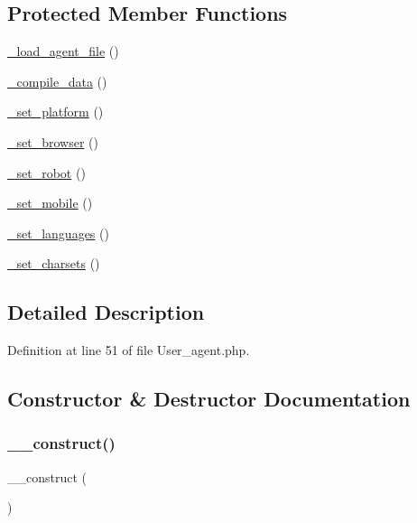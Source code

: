 \subsection*{Protected Member Functions}
\begin{DoxyCompactItemize}
\item 
\mbox{\hyperlink{class_c_i___user__agent_a96ec01490c667b47c5faec7cb53c34b2}{\+\_\+load\+\_\+agent\+\_\+file}} ()
\item 
\mbox{\hyperlink{class_c_i___user__agent_a4ced3acbcc2ab5e599f212c676590d06}{\+\_\+compile\+\_\+data}} ()
\item 
\mbox{\hyperlink{class_c_i___user__agent_a3e3af24bc0adb0483c3965765b28a25b}{\+\_\+set\+\_\+platform}} ()
\item 
\mbox{\hyperlink{class_c_i___user__agent_a6788d0353e44d81a1214fe367ebce0f5}{\+\_\+set\+\_\+browser}} ()
\item 
\mbox{\hyperlink{class_c_i___user__agent_a037f28a8a54578f57417d15fae820817}{\+\_\+set\+\_\+robot}} ()
\item 
\mbox{\hyperlink{class_c_i___user__agent_aa2b84face2c8bd1830f618bf9a57f196}{\+\_\+set\+\_\+mobile}} ()
\item 
\mbox{\hyperlink{class_c_i___user__agent_a14307e07c78ada7733b36660bce03db8}{\+\_\+set\+\_\+languages}} ()
\item 
\mbox{\hyperlink{class_c_i___user__agent_ae97780ac0ec104137f47641061288f3c}{\+\_\+set\+\_\+charsets}} ()
\end{DoxyCompactItemize}


\subsection{Detailed Description}


Definition at line 51 of file User\+\_\+agent.\+php.



\subsection{Constructor \& Destructor Documentation}
\mbox{\label{class_c_i___user__agent_a095c5d389db211932136b53f25f39685}} 
\subsubsection{\texorpdfstring{\_\_construct()}{\_\_construct()}}
{\footnotesize\ttfamily \+\_\+\+\_\+construct (\begin{DoxyParamCaption}{ }\end{DoxyParamCaption})}

